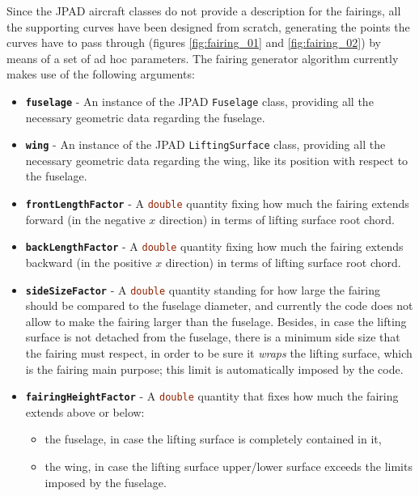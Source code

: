 \bigskip
\noindent
Since the \gls{JPAD} aircraft classes do not provide a description for the fairings, all the supporting curves have been designed from scratch, generating the points the curves have to pass through (figures \ref{fig:fairing_01} and \ref{fig:fairing_02}) by means of a set of ad hoc parameters. The fairing generator algorithm currently makes use of the following arguments:
%
\begin{itemize}
\renewcommand\labelitemi{\tiny$\blacksquare$}
\renewcommand\labelitemii{\tiny$\bullet$}
\item \textbf{\lstinline[language=Java]!fuselage!} - An instance of the \gls{JPAD} \lstinline[language=Java]!Fuselage! class, providing all the necessary geometric data regarding the fuselage. 
\item \textbf{\lstinline[language=Java]!wing!} - An instance of the \gls{JPAD} \lstinline[language=Java]!LiftingSurface! class, providing all the necessary geometric data regarding the wing, like its position with respect to the fuselage.
\item \textbf{\lstinline[language=Java]!frontLengthFactor!} - A \lstinline[language=Java]!double! quantity fixing how much the fairing extends forward (in the negative $x$ direction) in terms of lifting surface root chord.
\item \textbf{\lstinline[language=Java]!backLengthFactor!} - A \lstinline[language=Java]!double! quantity fixing how much the fairing extends backward (in the positive $x$ direction) in terms of lifting surface root chord.
\item \textbf{\lstinline[language=Java]!sideSizeFactor!} - A \lstinline[language=Java]!double! quantity standing for how large the fairing should be compared to the fuselage diameter, and currently the code does not allow to make the fairing larger than the fuselage. Besides, in case the lifting surface is not detached from the fuselage, there is a minimum side size that the fairing must respect, in order to be sure it \emph{wraps} the lifting surface, which is the fairing main purpose; this limit is automatically imposed by the code.
\item \textbf{\lstinline[language=Java]!fairingHeightFactor!} - A \lstinline[language=Java]!double! quantity that fixes how much the fairing extends above or below: 
%
\begin{itemize}
\item the fuselage, in case the lifting surface is completely contained in it, 
\item the wing, in case the lifting surface upper/lower surface exceeds the limits imposed by the fuselage. 

\end{itemize}
\end{itemize}
